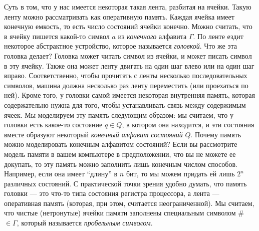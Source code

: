 Суть в том, что у нас имеется некоторая такая лента, разбитая на ячейки.
Такую ленту можно рассматривать как оперативную память.
Каждая ячейка имеет конечную емкость, то есть число состояний ячейки конечно.
Можно считать, что в ячейку пишется какой-то символ $a$ из {\it конечного} алфавита $\Gamma$.
По ленте ездит некоторое абстрактное устройство, которое называется {\it головкой}.
Что же эта головка делает?
Головка может читать символ из ячейки, и может писать символ в эту ячейку.
Также она может ленту двигать на один шаг влево или на один шаг вправо.
Соответственно, чтобы прочитать с ленты несколько последовательных символов, машина должна несколько раз ленту переместить (или проехаться по ней).
Кроме того, у головки самой имеется некоторая внутренняя память, которая содержательно нужна для того, чтобы устанавливать связь между содержимым ячеек.
Мы моделируем эту память следующим образом: мы считаем, что у головки есть какое-то состояние $q \in Q$, в котором она находится, и эти состояния вместе образуют некоторый {\it конечный алфавит состояний} $Q$.
Почему память можно моделировать конечным алфавитом состояний?
Если вы рассмотрите модель памяти в вашем компьютере в предположении, что вы не можете ее докупать, то эту память можно заполнить лишь конечным числом способов.
Например, если она имеет \enquote{длину} в $n$ бит, то мы можем придать ей лишь $2^{n}$ различных состояний.
С практической точки зрения удобно думать, что память головки --- это что-то типа состояния регистра процессора, а лента --- оперативная память (которая, при этом, считается неограниченной).
Мы считаем, что чистые (нетронутые) ячейки памяти заполнены специальным символом \# $\in \Gamma$, который называется {\it пробельным символом}.

